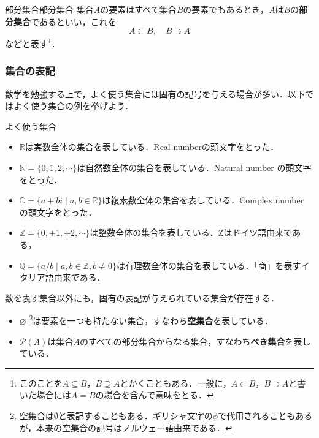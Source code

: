 \documentclass[a4paper,11pt]{ltjsarticle}
\renewcommand{\emph}[1]{\textbf{#1}}
\begin{document}
  \begin{definition}{部分集合}{部分集合}
    集合$A$の要素はすべて集合$B$の要素でもあるとき，$A$は$B$の\emph{部分集合}であるといい，これを
    \[
    A \subset B,\quad B \supset A
    \]
    などと表す\footnote{このことを$ A \subseteq B$，$B \supseteq A$とかくこともある．一般に，$A \subset B$，$ B \supset A$と書いた場合には$A=B$の場合を含んで意味をとる．}．
  \end{definition}


  \subsubsection{集合の表記}
  
  数学を勉強する上で，よく使う集合には固有の記号を与える場合が多い．以下ではよく使う集合の例を挙げよう．

  \begin{shadebox}
    よく使う集合
      \begin{itemize}
      \item $\mathbb{R}$は実数全体の集合を表している．Real numberの頭文字をとった．
      \item $\mathbb{N}=\{0,1,2,\cdots \}$は自然数全体の集合を表している．Natural number の頭文字をとった．
      \item $\mathbb{C}=\{ a+bi \mid a,b \in \mathbb{R}\}$は複素数全体の集合を表している．Complex number の頭文字をとった．
      \item $\mathbb{Z}=\{0, \pm 1 , \pm 2 , \cdots\}$は整数全体の集合を表している．Zはドイツ語由来である，
      \item $\mathbb{Q}=\{ a/b \mid   a,b \in \mathbb{Z},b \ne 0 \}$は有理数全体の集合を表している．「商」を表すイタリア語由来である．
      \end{itemize}
  \end{shadebox}


\begin{shadebox}
  数を表す集合以外にも，固有の表記が与えられている集合が存在する．
  \begin{itemize}
  \item $\varnothing$ \footnote{空集合は$\emptyset$と表記することもある．ギリシャ文字の$\phi$で代用されることもあるが，本来の空集合の記号はノルウェー語由来である．}は要素を一つも持たない集合，すなわち\emph{空集合}を表している．
  \item $\mathcal{P}(A)$は集合$A$のすべての部分集合からなる集合，すなわち\emph{べき集合}を表している．
 \end{itemize}
\end{shadebox}
  
\end{document}
